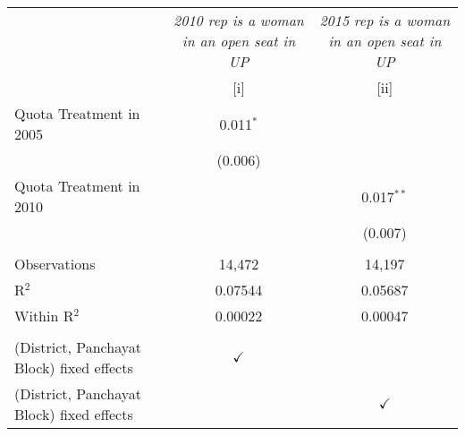 
\begingroup
\centering
\begin{tabular}{lcc}
   \toprule
                                             & \textit{2010 rep is a woman in an open seat in UP}  & \textit{2015 rep is a woman in an open seat in UP}\\   
                                             & [i]                                                 & [ii]\\  
   \midrule 
   Quota Treatment in 2005                   & 0.011$^{*}$                                         &   \\   
                                             & (0.006)                                             &   \\   
   Quota Treatment in 2010                   &                                                     & 0.017$^{**}$\\   
                                             &                                                     & (0.007)\\   
    \\
   Observations                              & 14,472                                              & 14,197\\  
   R$^2$                                     & 0.07544                                             & 0.05687\\  
   Within R$^2$                              & 0.00022                                             & 0.00047\\  
    \\
   (District, Panchayat Block) fixed effects & $\checkmark$                                        & \\  
   (District, Panchayat Block) fixed effects &                                                     & $\checkmark$\\   
   \bottomrule
\end{tabular}
\par\endgroup


